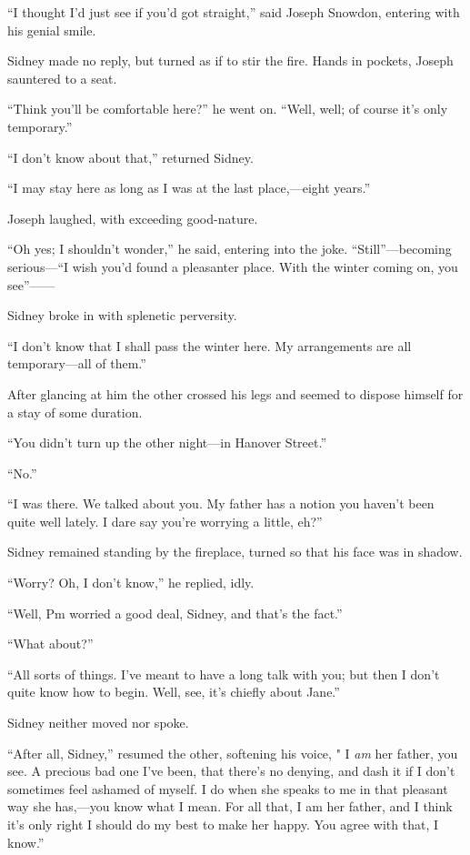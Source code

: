 ``I thought I'd just see if you'd got straight,'' said Joseph Snowdon,
entering with his genial smile.

Sidney made no reply, but turned as if to stir the fire. Hands in
pockets, Joseph sauntered to a seat.

``Think you'll be comfortable here?'' he went on. ``Well, well; of
course it's only temporary.''

``I don't know about that,'' returned Sidney.

``I may stay here as long as I was at the last place,---eight years.''

Joseph laughed, with exceeding good-nature.

``Oh yes; I shouldn't wonder,'' he said, entering into the joke.
``Still''---becoming {\protect\hypertarget{283}{}{}}serious---``I wish
you'd found a pleasanter place. With the winter coming on, you
see''{{------}}

Sidney broke in with splenetic perversity.

``I don't know that I shall pass the winter here. My arrangements are
all temporary---all of them.''

After glancing at him the other crossed his legs and seemed to dispose
himself for a stay of some duration.

``You didn't turn up the other night---in Hanover Street.''

``No.''

``I was there. We talked about you. My father has a notion you haven't
been quite well lately. I dare say you're worrying a little, eh?''

Sidney remained standing by the fireplace, turned so that his face was
in shadow.

``Worry? Oh, I don't know,'' he replied, idly.

``Well, Pm worried a good deal, Sidney, and that's the fact.''

``What about?''

{\protect\hypertarget{284}{}{}}``All sorts of things. I've meant to have
a long talk with you; but then I don't quite know how to begin. Well,
see, it's chiefly about Jane.''

Sidney neither moved nor spoke.

``After all, Sidney,'' resumed the other, softening his voice, " I
\emph{am} her father, you see. A precious bad one I've been, that
there's no denying, and dash it if I don't sometimes feel ashamed of
myself. I do when she speaks to me in that pleasant way she has,---you
know what I mean. For all that, I am her father, and I think it's only
right I should do my best to make her happy. You agree with that, I
know.''

